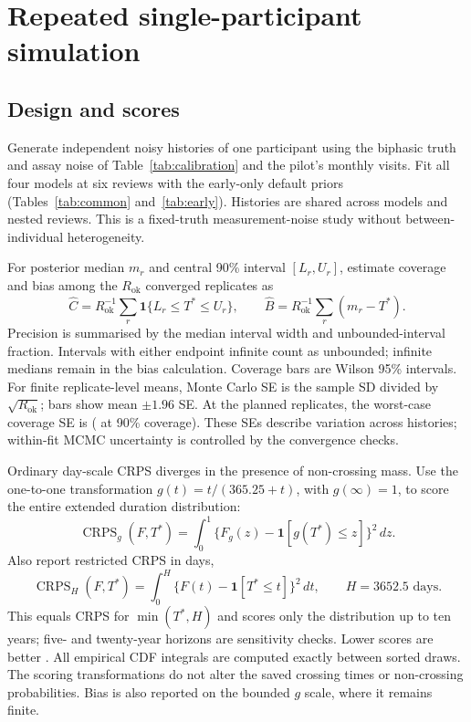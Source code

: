 \section{Repeated single-participant simulation}

\subsection{Design and scores}
Generate \RepeatN{} independent noisy histories of one participant using
the biphasic truth and assay noise of Table~\ref{tab:calibration} and
the pilot's monthly visits.
Fit all four models at six reviews with the early-only default priors
(Tables~\ref{tab:common} and~\ref{tab:early}). Histories are shared across
models and nested reviews. This is a fixed-truth measurement-noise study
without between-individual heterogeneity.

For posterior median $m_r$ and central 90\% interval $[L_r,U_r]$, estimate
coverage and bias among the $R_{\mathrm{ok}}$ converged replicates as
\begin{equation}
  \widehat C=R_{\mathrm{ok}}^{-1}\sum_r
    \mathbf1\{L_r\leq T^*\leq U_r\},\qquad
  \widehat B=R_{\mathrm{ok}}^{-1}\sum_r(m_r-T^*).
\end{equation}
Precision is summarised by the median interval width and unbounded-interval
fraction. Intervals with either endpoint infinite count as unbounded;
infinite medians remain in the bias calculation. Coverage bars are Wilson
95\% intervals. For finite replicate-level means, Monte Carlo SE is the
sample SD divided by $\sqrt{R_{\mathrm{ok}}}$; bars show mean
$\pm1.96$ SE. At the planned \RepeatN{} replicates, the worst-case
coverage SE is \RepeatCoverageMaxSe{} (\RepeatCoverageNominalSe{} at
90\% coverage). These SEs describe variation across histories; within-fit
MCMC uncertainty is controlled by the convergence checks.

Ordinary day-scale CRPS diverges in the presence of non-crossing mass.
Use the one-to-one transformation $g(t)=t/(365.25+t)$, with
$g(\infty)=1$, to score the entire extended duration distribution:
\begin{equation}
  \operatorname{CRPS}_g(F,T^*)=
  \int_0^1\{F_g(z)-\mathbf1[g(T^*)\leq z]\}^2\,dz.
\end{equation}
Also report restricted CRPS in days,
\begin{equation}
  \operatorname{CRPS}_H(F,T^*)=
  \int_0^H\{F(t)-\mathbf1[T^*\leq t]\}^2\,dt,
  \qquad H=3652.5\text{ days}.
\end{equation}
This equals CRPS for $\min(T^*,H)$ and scores only the distribution up to
ten years; five- and twenty-year horizons are sensitivity checks. Lower
scores are better \parencite{gneiting2007}. All empirical CDF integrals are
computed exactly between sorted draws. The scoring transformations do not
alter the saved crossing times or non-crossing probabilities. Bias is also
reported on the bounded $g$ scale, where it remains finite.

